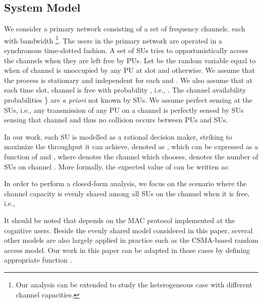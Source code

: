 \documentclass[12pt, onecolumn]{IEEEtran}
\theoremstyle{plain}
\theoremstyle{definition}
\begin{document}
\subsection{System Model}
We consider a primary network consisting of a set  of  frequency channels, each with bandwidth \footnote{Our analysis can be extended to study the heterogeneous case with different channel capacities.}. The users in the primary network are
operated in a synchronous time-slotted fashion. A set  of  SUs tries to opportunistically access the channels when they are left free by PUs. Let  be the random variable equal to  when of channel  is unoccupied by any PU at slot  and  otherwise. We assume that the process  is stationary and independent for each  and . We also assume
that at each time slot, channel  is free with probability , i.e., . The channel availability probabilities \} are {\it a priori} not known by SUs. We assume perfect sensing at the SUs, i.e., any transmission of any PU on a channel is perfectly sensed by SUs sensing that channel and thus no collision occurs between PUs and SUs.

In our work, each SU  is modelled as a rational decision maker, striking to maximize the throughput it can achieve, denoted as , which can be expressed as a function of  and , where  denotes the channel which  chooses,  denotes the number of SUs on channel . More formally, the expected value of  can be written as:

In order to perform a closed-form analysis, we focus on the scenario where the channel capacity is evenly shared among all SUs on the channel when it is free, i.e.,

It should be noted that  depends on the MAC protocol implemented at the cognitive users. Beside the evenly shared model considered in this paper, several other models are also largely applied in practice such as the CSMA-based random access model. Our work in this paper can be adapted in those cases by defining appropriate function .

\begin{comment}

\begin{itemize}
	\item Collision model: in this simplified model, if more than one SU accesses the same channel , there is a collision, in this model, we have

	\item Random access model: in this model, the SUs implement a  random access protocol to avoid collisions, such as Aloha and CSMA based MAC protocols or their variants, in this case, we have

where  denotes the successful transmission probability with  SUs on the same channel . Note that  can be derived from the Markov chain model of the protocol used (e.g.,~\cite{Bianchi00}).
\end{itemize}

\end{comment}
\end{document}
